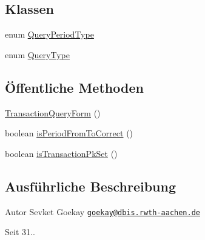 \subsection*{Klassen}
\begin{DoxyCompactItemize}
\item 
enum \hyperlink{enumde_1_1rwth_1_1idsg_1_1steve_1_1web_1_1dto_1_1_transaction_query_form_1_1_query_period_type}{Query\-Period\-Type}
\item 
enum \hyperlink{enumde_1_1rwth_1_1idsg_1_1steve_1_1web_1_1dto_1_1_transaction_query_form_1_1_query_type}{Query\-Type}
\end{DoxyCompactItemize}
\subsection*{Öffentliche Methoden}
\begin{DoxyCompactItemize}
\item 
\hyperlink{classde_1_1rwth_1_1idsg_1_1steve_1_1web_1_1dto_1_1_transaction_query_form_aca95699b17b59900198861cac2bbf6b3}{Transaction\-Query\-Form} ()
\item 
boolean \hyperlink{classde_1_1rwth_1_1idsg_1_1steve_1_1web_1_1dto_1_1_transaction_query_form_a269b0a8238466eb10b29e3661fa482e0}{is\-Period\-From\-To\-Correct} ()
\item 
boolean \hyperlink{classde_1_1rwth_1_1idsg_1_1steve_1_1web_1_1dto_1_1_transaction_query_form_a43bb8d854a96eccc55e6cb888e81cade}{is\-Transaction\-Pk\-Set} ()
\end{DoxyCompactItemize}


\subsection{Ausführliche Beschreibung}
\begin{DoxyAuthor}{Autor}
Sevket Goekay \href{mailto:goekay@dbis.rwth-aachen.de}{\tt goekay@dbis.\-rwth-\/aachen.\-de} 
\end{DoxyAuthor}
\begin{DoxySince}{Seit}
31.. 
\end{DoxySince}


